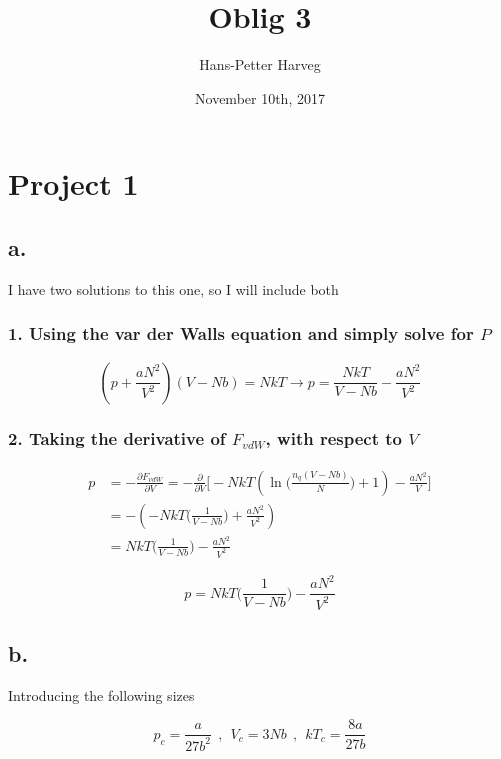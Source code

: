 \documentclass{article}
\title{Oblig 3}
\author{Hans-Petter Harveg}
\date{November 10th, 2017}
\begin{document}
\maketitle

\section*{Project 1}

\subsection*{a.}

I have two solutions to this one, so I will include both

\subsubsection*{1. Using the var der Walls equation and simply solve for $P$}

\begin{equation}
(p + \frac{aN^2}{V^2})(V - Nb) = NkT \rightarrow p = \frac{NkT}{V-Nb} - \frac{aN^2}{V^2}
\end{equation}

\subsubsection*{2. Taking the derivative of $F_{vdW}$, with respect to $V$}

\begin{align*}
p & = -\frac{\partial F_{vdW}}{\partial V} = -\frac{\partial}{\partial V}\bigg[-NkT(\ln \bigg( \frac{n_q(V-Nb)}{N} \bigg) + 1) - \frac{aN^2}{V} \bigg]\\
 & = -(-NkT\bigg(\frac{1}{V-Nb}\bigg) + \frac{aN^2}{V^2})\\
 & = NkT\bigg(\frac{1}{V-Nb}\bigg) - \frac{aN^2}{V^2}
\end{align*}

\begin{equation}
 p = NkT\bigg(\frac{1}{V-Nb}\bigg) - \frac{aN^2}{V^2}
\end{equation}

\subsection*{b.}

Introducing the following sizes

\begin{equation*}
p_c = \frac{a}{27b^2} \ \ , \ \ V_c = 3Nb \ \ , \ \ kT_c = \frac{8a}{27b}
\end{equation*}
\end{document}
